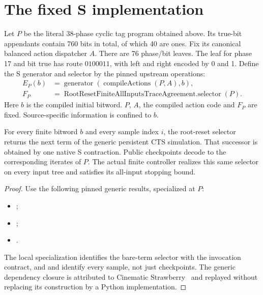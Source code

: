 

\section{The fixed S implementation}\label{sec:backend}

Let $P$ be the literal 38-phase cyclic tag program obtained above. Its true-bit
appendants contain 760 bits in total, of which 40 are ones. Fix its canonical
balanced action dispatcher $A$. There are 76 phase/bit leaves. The leaf for
phase 17 and bit true has route $0100011$, with left and right encoded by 0
and 1. Define the S generator and selector by the pinned upstream operations:
\begin{align*}
 E_P(b)&=\operatorname{generator}(\operatorname{compileActions}(P,A),b),\\
 F_P&=\operatorname{RootResetFiniteAllInputsTraceAgreement.selector}(P).
\end{align*}
Here $b$ is the compiled initial bitword. $P$, $A$, the compiled action code and
$F_P$ are fixed. Source-specific information is confined to $b$.

\begin{proposition}\label{prop:generic}
For every finite bitword $b$ and every sample index $i$, the root-reset selector
returns the next term of the generic persistent CTS simulation. That successor
is obtained by one native S contraction. Public checkpoints decode to the
corresponding iterates of $P$. The actual finite controller realizes this same
selector on every input tree and satisfies its all-input stopping bound.
\end{proposition}

\begin{proof}
Use the following pinned generic results, specialized at $P$:
\begin{itemize}[nosep]
\item {};
\item {};
\item {}.
\end{itemize}
The local specialization  identifies the
bare-term selector with the invocation contract, and
 and  identify every
sample, not just checkpoints. The generic dependency closure is attributed
to Cinematic Strawberry~\cite{strawberry,generic} and replayed without replacing
its construction by a Python implementation.
\end{proof}

